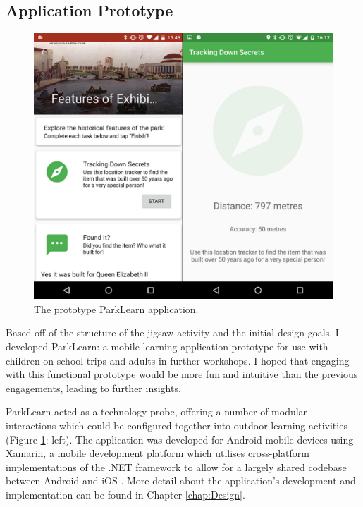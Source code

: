 \subsection{Application Prototype}

\begin{figure}
  \centering
  \includegraphics[width=0.8\columnwidth]{images/chapter04/parklearnprototype.png}
  \caption{The prototype ParkLearn application.}
  \label{fig:parklearnPrototype}
\end{figure}

Based off of the structure of the jigsaw activity and the initial design goals, I developed ParkLearn: a mobile learning application prototype for use with children on school trips and adults in further workshops. I hoped that engaging with this functional prototype would be more fun and intuitive than the previous engagements, leading to further insights.

ParkLearn acted as a technology probe, offering a number of modular interactions which could be configured together into outdoor learning activities (Figure \ref{fig:parklearnPrototype}: left). The application was developed for Android mobile devices using Xamarin, a mobile development platform which utilises cross-platform implementations of the .NET framework to allow for a largely shared codebase between Android and iOS \citep{Xamarin2016}. More detail about the application's development and implementation can be found in Chapter \ref{chap:Design}.

